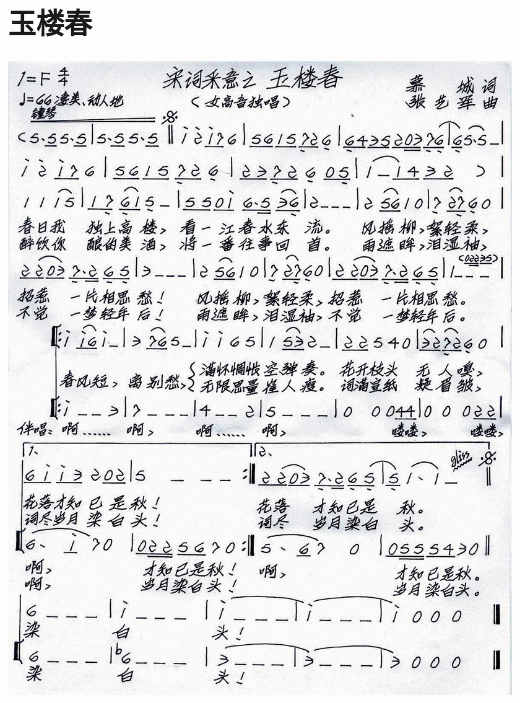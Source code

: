 \documentclass[cn,pad,chinese,chinesefont=nofont]{elegantbook}
\begin{document}
\section{玉楼春}
    \includegraphics[width=\textwidth]{dongxiao/20200323玉楼春.jpg}
\end{document}
